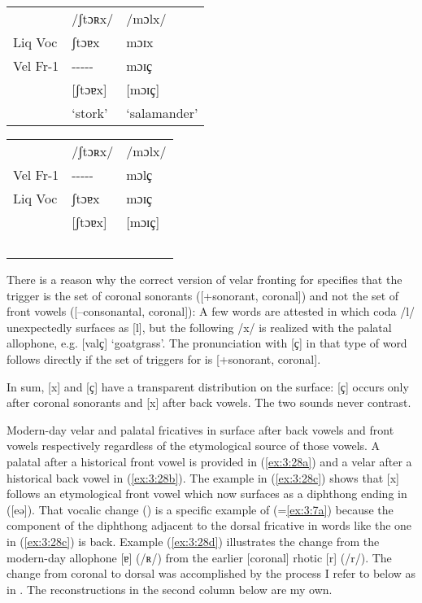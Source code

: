 \ea%
\label{ex:3:27}
\tabcolsep=3pt
\begin{multicols}{2}\raggedcolumns
\ea \begin{tabular}[t]{@{}lll@{}}
          & /ʃtɔʀx/         & /mɔlx/ \\ 
Liq Voc   & ʃtɔɐx           &  mɔɪx  \\              
Vel Fr-1  & {}-{}-{}-{}-{}- &  mɔɪ{ҫ}\\ 
          &  [ʃtɔɐx]        & [mɔɪҫ] \\              
          &  ‘stork’        & ‘salamander’
      \end{tabular}
\ex \begin{tabular}[t]{@{}lll@{}}      
         & /ʃtɔʀx/         & /mɔlx/  \\
Vel Fr-1 & {}-{}-{}-{}-{}- & mɔl{ҫ}  \\
 Liq Voc &  ʃtɔɐx          & mɔɪ{ҫ}  \\
         & [ʃtɔɐx]         & [mɔɪ{ҫ]}\\
         &    ~             &  ~  \\
    \end{tabular}
\z
\end{multicols}
\z 

There is a reason why the correct version of velar fronting for  specifies that the trigger is the set of coronal sonorants ([+sonorant, coronal]) and not the set of front vowels ([--consonantal, coronal]): A few words are attested in which coda /l/ unexpectedly surfaces as [l], but the following /x/ is realized with the palatal allophone, e.g. [val{ҫ] ‘goatgrass’. The}  pronunciation with [{ҫ] in that type of word follows directly if the set of triggers for  is [+sonorant, coronal].}

In sum, [x] and [{ҫ] have a transparent distribution on the surface: [ҫ] occurs only after coronal sonorants and [x] after back vowels. The two sounds never contrast.}

Modern-day velar and palatal fricatives in  surface after back vowels and front vowels respectively regardless of the etymological source of those vowels. A palatal after a historical front vowel is provided in (\ref{ex:3:28a}) and a velar after a historical back vowel in (\ref{ex:3:28b}). The example in (\ref{ex:3:28c}) shows that [x] follows an etymological front vowel which now surfaces as a diphthong ending in  ([eə]). That vocalic change () is a specific example of  (=\ref{ex:3:7a}) because the component of the diphthong adjacent to the dorsal fricative in words like the one in (\ref{ex:3:28c}) is back. Example (\ref{ex:3:28d}) illustrates the change from the modern-day allophone [ɐ] (/ʀ/) from the earlier [coronal] rhotic [r] (/r/). The change from coronal to dorsal was accomplished by the process I refer to below as  in . The reconstructions in the second column below are my own.\pagebreak

